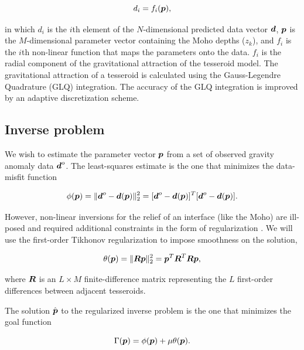 \documentclass[extra]{gji}
\newcommand{\mbf}[1]{\hbox{\mathversion{bold}$#1$}}
\begin{document}
\begin{equation}
    d_i = f_i(\mbf{p}),
\end{equation}

\noindent in which $d_i$ is the $i$th element of the $N$-dimensional predicted
data vector $\mbf{d}$, $\mbf{p}$ is the $M$-dimensional parameter vector
containing the Moho depths ($z_k$),
and $f_i$ is the $i$th non-linear function that maps the parameters onto the
data.
$f_i$ is the radial component of the gravitational attraction of the tesseroid
model.
The gravitational attraction of a tesseroid is calculated using the
Gauss-Legendre Quadrature (GLQ) integration.
The accuracy of the GLQ integration is improved by an adaptive discretization
scheme.


\subsection{Inverse problem}

We wish to estimate the parameter vector $\mbf{p}$ from a set of observed
gravity anomaly data $\mbf{d}^o$.
The least-squares estimate is the one that minimizes the data-misfit function

\begin{equation}
    \phi(\mbf{p}) = \|\mbf{d}^o - \mbf{d}(\mbf{p})\|_2^2
    = [\mbf{d}^o - \mbf{d}(\mbf{p})]^T[\mbf{d}^o - \mbf{d}(\mbf{p})].
\end{equation}

\noindent However, non-linear inversions for the relief of an interface (like
the Moho) are ill-posed and required additional constraints in the form of
regularization \citep{silva_potential-field_2001}.
We will use the first-order Tikhonov regularization to impose smoothness on the
solution,

\begin{equation}
    \theta(\mbf{p}) = \|\mbf{R}\mbf{p}\|^2_2
    = \mbf{p}^T\mbf{R}^T\mbf{R}\mbf{p},
\end{equation}

\noindent where $\mbf{R}$ is an $L \times M$ finite-difference matrix
representing the $L$ first-order differences between adjacent tesseroids.

The solution $\hat{\mbf{p}}$ to the regularized inverse problem is the one that
minimizes the goal function

\begin{equation}
    \Gamma(\mbf{p}) = \phi(\mbf{p}) + \mu\theta(\mbf{p}).
\end{equation}
\end{document}
